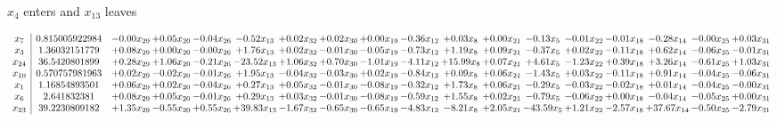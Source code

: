 \documentclass[9pt]{article}
\begin{document}
 $ x_{4} $ enters and $ x_{13} $ leaves 

 \[\begin{array}{c| c c@{\hskip 2pt} c@{\hskip 2pt} c@{\hskip 2pt} c@{\hskip 2pt} c@{\hskip 2pt} c@{\hskip 2pt} c@{\hskip 2pt} c@{\hskip 2pt} c@{\hskip 2pt} c@{\hskip 2pt} c@{\hskip 2pt} c@{\hskip 2pt} c@{\hskip 2pt} c@{\hskip 2pt} c@{\hskip 2pt} c@{\hskip 2pt} }
 x_{7}   &  0.815005922984 & -0.00 x_{29} & +  0.05 x_{20} & -0.04 x_{26} & -0.52 x_{13} & +  0.02 x_{32} & +  0.02 x_{30} & +  0.00 x_{19} & -0.36 x_{12} & +  0.03 x_{8} & +  0.00 x_{21} & -0.13 x_{5} & -0.01 x_{22} & -0.01 x_{18} & -0.28 x_{14} & -0.00 x_{25} & +  0.03 x_{31}\\
 x_{3}   &  1.36032151779 & +  0.08 x_{29} & +  0.00 x_{20} & -0.00 x_{26} & +  1.76 x_{13} & +  0.02 x_{32} & -0.01 x_{30} & -0.05 x_{19} & -0.73 x_{12} & +  1.19 x_{8} & +  0.09 x_{21} & -0.37 x_{5} & +  0.02 x_{22} & -0.11 x_{18} & +  0.62 x_{14} & -0.06 x_{25} & -0.01 x_{31}\\
 x_{24}   &  36.5420801899 & +  0.28 x_{29} & +  1.06 x_{20} & -0.21 x_{26} & -23.52 x_{13} & +  1.06 x_{32} & +  0.70 x_{30} & -1.01 x_{19} & -4.11 x_{12} & + 15.99 x_{8} & +  0.07 x_{21} & +  4.61 x_{5} & -1.23 x_{22} & +  0.39 x_{18} & +  3.26 x_{14} & -0.61 x_{25} & +  1.03 x_{31}\\
 x_{10}   &  0.570757981963 & +  0.02 x_{29} & -0.02 x_{20} & -0.01 x_{26} & +  1.95 x_{13} & -0.04 x_{32} & -0.03 x_{30} & +  0.02 x_{19} & -0.84 x_{12} & +  0.09 x_{8} & +  0.06 x_{21} & -1.43 x_{5} & +  0.03 x_{22} & -0.11 x_{18} & +  0.91 x_{14} & -0.04 x_{25} & -0.06 x_{31}\\
 x_{1}   &  1.16854893501 & +  0.06 x_{29} & +  0.02 x_{20} & -0.04 x_{26} & +  0.27 x_{13} & +  0.05 x_{32} & -0.01 x_{30} & -0.08 x_{19} & -0.32 x_{12} & +  1.73 x_{8} & +  0.06 x_{21} & -0.29 x_{5} & -0.03 x_{22} & -0.02 x_{18} & +  0.01 x_{14} & -0.04 x_{25} & -0.00 x_{31}\\
 x_{6}   &  2.641832381 & +  0.08 x_{29} & +  0.05 x_{20} & -0.01 x_{26} & +  0.29 x_{13} & +  0.03 x_{32} & -0.01 x_{30} & -0.08 x_{19} & -0.59 x_{12} & +  1.55 x_{8} & +  0.02 x_{21} & -0.79 x_{5} & -0.06 x_{22} & +  0.00 x_{18} & -0.04 x_{14} & -0.05 x_{25} & +  0.00 x_{31}\\
 x_{23}   &  39.2230809182 & +  1.35 x_{29} & -0.55 x_{20} & +  0.55 x_{26} & + 39.83 x_{13} & -1.67 x_{32} & -0.65 x_{30} & -0.65 x_{19} & -4.83 x_{12} & -8.21 x_{8} & +  2.05 x_{21} & -43.59 x_{5} & +  1.21 x_{22} & -2.57 x_{18} & + 37.67 x_{14} & -0.50 x_{25} & -2.79 x_{31}\\

\end{array}\]
\end{document}
